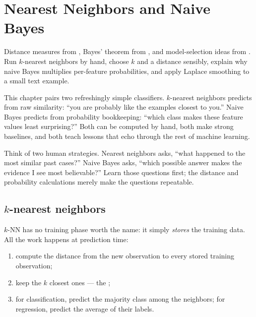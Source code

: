 \chapter{Nearest Neighbors and Naive Bayes}
\label{ch:knn-nb}

\chapterguide%
  {Distance measures from , Bayes' theorem from , and model-selection ideas from .}
  {Run $k$-nearest neighbors by hand, choose $k$ and a distance sensibly, explain why naive Bayes multiplies per-feature probabilities, and apply Laplace smoothing to a small text example.}

This chapter pairs two refreshingly simple classifiers. $k$-nearest neighbors predicts from raw similarity: ``you are probably like the examples closest to you.'' Naive Bayes predicts from probability bookkeeping: ``which class makes these feature values least surprising?'' Both can be computed by hand, both make strong baselines, and both teach lessons that echo through the rest of machine learning.

\begin{firstread}
Think of two human strategies. Nearest neighbors asks, ``what happened to the most similar past cases?'' Naive Bayes asks, ``which possible answer makes the evidence I see most believable?'' Learn those questions first; the distance and probability calculations merely make the questions repeatable.
\end{firstread}

\section{$k$-nearest neighbors}
\label{sec:knn}

$k$-NN has no training phase worth the name: it simply \emph{stores} the training data. All the work happens at prediction time:

\begin{enumerate}
  \item compute the distance from the new observation to every stored training observation;
  \item keep the $k$ closest ones --- the ;
  \item for classification, predict the majority class among the neighbors; for regression, predict the average of their labels.
\end{enumerate}


